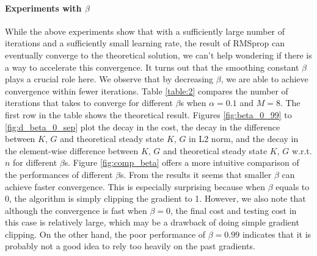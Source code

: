 \documentclass{article}
\begin{document}
\paragraph{Experiments with $\beta$}
While the above experiments show that with a sufficiently large number of iterations and a sufficiently small learning rate, the result of RMSprop can eventually converge to the theoretical solution, we can't help wondering if there is a way to accelerate this convergence. It turns out that the smoothing constant $\beta$ plays a crucial role here. We observe that by decreasing $\beta$, we are able to achieve convergence within fewer iterations. Table \ref{table:2} compares the number of iterations that takes to converge for different $\beta$s when $\alpha = 0.1$ and $M = 8$. The first row in the table shows the theoretical result. Figures \ref{fig:beta_0_99} to \ref{fig:d_beta_0_sep} plot the decay in the cost, the decay in the difference between $K$, $G$ and theoretical steady state $K$, $G$ in L2 norm, and the decay in the element-wise difference between $K$, $G$ and theoretical steady state $K$, $G$ w.r.t. $n$ for different $\beta$s. Figure \ref{fig:comp_beta} offers a more intuitive comparison of the performances of different $\beta$s. From the results it seems that smaller $\beta$ can achieve faster convergence. This is especially surprising because when $\beta$ equals to 0, the algorithm is simply clipping the gradient to 1. However, we also note that although the convergence is fast when $\beta = 0$, the final cost and testing cost in this case is relatively large, which may be a drawback of doing simple gradient clipping. On the other hand, the poor performance of $\beta = 0.99$ indicates that it is probably not a good idea to rely too heavily on the past gradients.  \\
\end{document}
